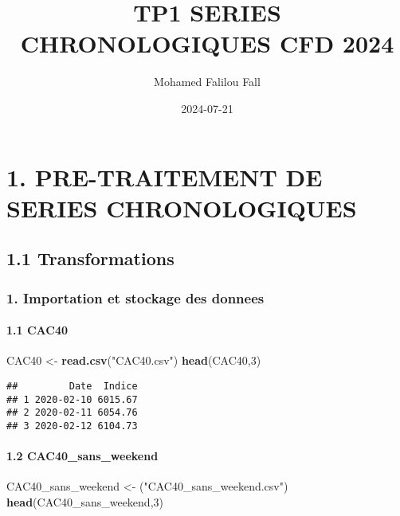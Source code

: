\documentclass[
]{article}
\title{TP1 SERIES CHRONOLOGIQUES CFD 2024}
\author{Mohamed Falilou Fall}
\date{2024-07-21}
\newenvironment{Shaded}{\begin{snugshade}}{\end{snugshade}}
\newcommand{\DecValTok}[1]{\textcolor[rgb]{0.00,0.00,0.81}{#1}}
\newcommand{\FunctionTok}[1]{\textcolor[rgb]{0.13,0.29,0.53}{\textbf{#1}}}
\newcommand{\NormalTok}[1]{#1}
\newcommand{\OtherTok}[1]{\textcolor[rgb]{0.56,0.35,0.01}{#1}}
\newcommand{\StringTok}[1]{\textcolor[rgb]{0.31,0.60,0.02}{#1}}
\begin{document}
\maketitle

{
\setcounter{tocdepth}{3}
\tableofcontents
}
\section{1. PRE-TRAITEMENT DE SERIES
CHRONOLOGIQUES}\label{pre-traitement-de-series-chronologiques}

\subsection{1.1 Transformations}\label{transformations}

\subsubsection{1. Importation et stockage des
donnees}\label{importation-et-stockage-des-donnees}

\paragraph{1.1 CAC40}\label{cac40}

\begin{Shaded}
\begin{Highlighting}[]
\NormalTok{CAC40 }\OtherTok{\textless{}{-}} \FunctionTok{read.csv}\NormalTok{(}\StringTok{"CAC40.csv"}\NormalTok{)}
\FunctionTok{head}\NormalTok{(CAC40,}\DecValTok{3}\NormalTok{)}
\end{Highlighting}
\end{Shaded}

\begin{verbatim}
##         Date  Indice
## 1 2020-02-10 6015.67
## 2 2020-02-11 6054.76
## 3 2020-02-12 6104.73
\end{verbatim}

\paragraph{1.2 CAC40\_sans\_weekend}\label{cac40_sans_weekend}

\begin{Shaded}
\begin{Highlighting}[]
\NormalTok{CAC40\_sans\_weekend }\OtherTok{\textless{}{-}}\NormalTok{ (}\StringTok{"CAC40\_sans\_weekend.csv"}\NormalTok{)}
\FunctionTok{head}\NormalTok{(CAC40\_sans\_weekend,}\DecValTok{3}\NormalTok{)}
\end{Highlighting}
\end{Shaded}
\end{document}

